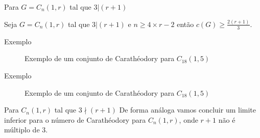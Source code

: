 \begin{frame}{Para $G=C_n(1,r)$ tal que $3 | (r+1)$}
    \begin{teo}
        \label{theorem-carat-1-rx3}
        Seja $G = C_n(1,r)$ tal que $3 | (r+1)$ e $n \ge 4\times r - 2$ então $c(G) \ge \frac{2(r+1)}{3}$.%
    \end{teo}
\end{frame}


\begin{frame}{Exemplo}
    \begin{figure}
        \centering
        \resizebox{\textwidth}{!}{
            \centering
            
        }
        \caption{Exemplo de um conjunto de Carathéodory para $C_{18}(1,5)$}
        \label{fig-c18-pt1}
    \end{figure}
\end{frame}


\begin{frame}{Exemplo}
    \begin{figure}
        \centering
        \resizebox{\textwidth}{!}{
            \centering
            
        }
        \caption{Exemplo de um conjunto de Carathéodory para $C_{18}(1,5)$}
        \label{fig-c18-pt2}
    \end{figure}
\end{frame}


\begin{frame}{Para $C_n(1,r)$ tal que $3\nmid(r+1)$}
    De forma análoga vamos concluir um limite inferior para o número de Carathéodory para $C_n(1,r)$, onde $r+1$ não é múltiplo de 3.
\end{frame}

%         

